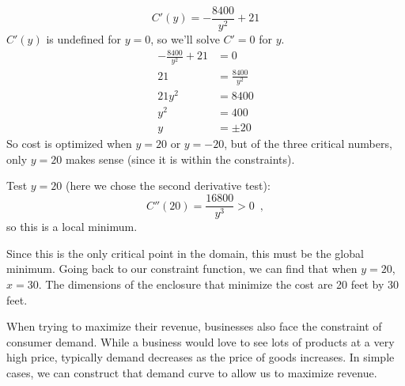 \begin{example}
\begin{solution}
$$C'(y)=-\dfrac{8400}{y^2}+21$$
$C'(y)$ is undefined for $y=0$, so we'll solve $C'=0$ for $y$.
\begin{align*}
  -\frac{8400}{y^2}+21 &= 0\\
  21 &= \frac{8400}{y^2} \\
  21 y^2 &= 8400\\
  y^2 &= 400\\
  y &= \pm 20
\end{align*}
So cost is optimized when $y=20$ or $y=-20$, but of the three critical numbers, only $y=20$ makes sense (since it is within the constraints).

Test $y=20$ (here we chose the second derivative test):
$$C''(20)=\dfrac{16800}{y^3}>0 \enspace ,$$
so this is a local minimum.

Since this is the only critical point in the domain, this must be the global minimum. Going back to our constraint function, we can find that when $y=20$, $x=30$. The dimensions of the enclosure that minimize the cost are 20 feet by 30 feet.
\end{solution}\end{example}

When trying to maximize their revenue, businesses also face the constraint of consumer demand. While a business would love to see lots of products at a very high price, typically demand decreases as the price of goods increases. In simple cases, we can construct that demand curve to allow us to maximize revenue.

